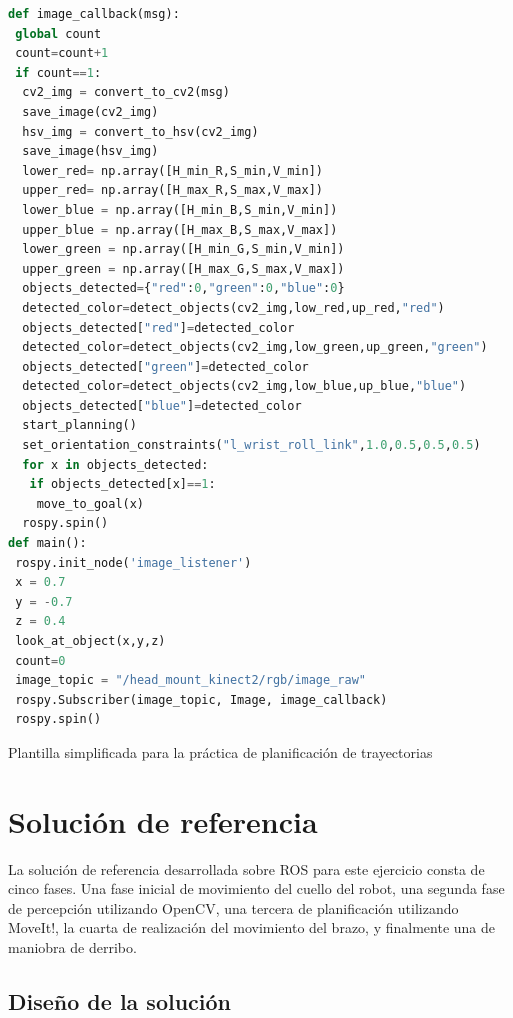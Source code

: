 \documentclass[12pt,spanish,chapterprefix, numbers=noenddot]{book}
\numberwithin{equation}{section}
\numberwithin{figure}{section}
\begin{document}
\begin{algorithm}[htb!]
	\begin{lstlisting}[breaklines=true,language=python]    
def image_callback(msg):
 global count
 count=count+1
 if count==1:
  cv2_img = convert_to_cv2(msg)
  save_image(cv2_img)
  hsv_img = convert_to_hsv(cv2_img)
  save_image(hsv_img)
  lower_red= np.array([H_min_R,S_min,V_min])
  upper_red= np.array([H_max_R,S_max,V_max])
  lower_blue = np.array([H_min_B,S_min,V_min])
  upper_blue = np.array([H_max_B,S_max,V_max])
  lower_green = np.array([H_min_G,S_min,V_min])
  upper_green = np.array([H_max_G,S_max,V_max])
  objects_detected={"red":0,"green":0,"blue":0}
  detected_color=detect_objects(cv2_img,low_red,up_red,"red")
  objects_detected["red"]=detected_color
  detected_color=detect_objects(cv2_img,low_green,up_green,"green")
  objects_detected["green"]=detected_color
  detected_color=detect_objects(cv2_img,low_blue,up_blue,"blue")
  objects_detected["blue"]=detected_color
  start_planning()
  set_orientation_constraints("l_wrist_roll_link",1.0,0.5,0.5,0.5)
  for x in objects_detected:
   if objects_detected[x]==1:
    move_to_goal(x)
  rospy.spin()
def main():
 rospy.init_node('image_listener')
 x = 0.7
 y = -0.7
 z = 0.4
 look_at_object(x,y,z)
 count=0
 image_topic = "/head_mount_kinect2/rgb/image_raw"
 rospy.Subscriber(image_topic, Image, image_callback)
 rospy.spin()
	\end{lstlisting}
\caption{\label{alg:template-py}Plantilla simplificada para la práctica de planificación de trayectorias}
\end{algorithm}

\chapter{Solución de referencia}\label{sec:solución}
La solución de referencia desarrollada sobre ROS para este ejercicio consta de cinco fases. Una fase inicial de movimiento del cuello del robot, una segunda fase de percepción utilizando OpenCV, una tercera de planificación utilizando MoveIt!, la cuarta de realización del movimiento del brazo, y finalmente una de maniobra de derribo. 

\section{Diseño de la solución}
\end{document}

